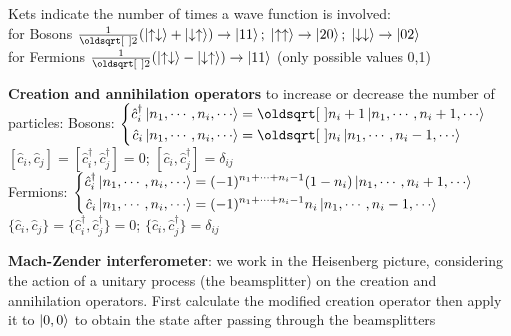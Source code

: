 \begin{squishlist}
    \item Kets indicate the number of times a wave function is involved:\\
    for Bosons $\frac{1}{\sqrt{2}} ( \ket{\uparrow \downarrow} + \ket{\downarrow \uparrow}) \rightarrow \ket{11};\; \ket{\uparrow \uparrow} \rightarrow \ket{20};\; \ket{\downarrow \downarrow} \rightarrow \ket{02}$\\
    for Fermions $\frac{1}{\sqrt{2}} ( \ket{\uparrow \downarrow} - \ket{\downarrow \uparrow}) \rightarrow \ket{11}$ (only possible values 0,1)
    \item \textbf{Creation and annihilation operators} to increase or decrease the number of particles:
    Bosons:  $\left\{ \begin{aligned}
    \hat{c}_i^{\dagger} \ket{n_1, \cdots, n_i, \cdots} &= \sqrt{n_i + 1} \ket{n_1, \cdots, n_i +1, \cdots} \\
    \hat{c}_i \ket{n_1, \cdots, n_i, \cdots} &= \sqrt{n_i} \ket{n_1, \cdots, n_i -1, \cdots}
    \end{aligned}\right.$ \\
    $[\hat{c}_i, \hat{c}_j] = [\hat{c}_i^{\dagger}, \hat{c}_j^{\dagger}] = 0$; \qquad $[\hat{c}_i, \hat{c}_j^{\dagger}] = \delta_{ij}$ \\
    Fermions: $\left\{ \begin{aligned}
    \hat{c}_i^{\dagger} \ket{n_1, \cdots, n_i, \cdots} &= (-1)^{n_1+\cdots+n_i-1}(1-n_i) \ket{n_1, \cdots, n_i +1, \cdots} \\
    \hat{c}_i \ket{n_1, \cdots, n_i, \cdots} &= (-1)^{n_1+\cdots+n_i-1} n_i \ket{n_1, \cdots, n_i -1, \cdots}
    \end{aligned}\right.$ \\
    $\{\hat{c}_i, \hat{c}_j\} = \{\hat{c}_i^{\dagger}, \hat{c}_j^{\dagger}\} = 0$; \qquad $\{\hat{c}_i, \hat{c}_j^{\dagger}\} = \delta_{ij}$ 

    \item \textbf{Mach-Zender interferometer}: we work in the Heisenberg picture, considering the action of a unitary process (the beamsplitter) on the creation and annihilation operators. First calculate the modified creation operator then apply it to $\ket{0,0}$ to obtain the state after passing through the beamsplitters
\end{squishlist}

\columnbreak


